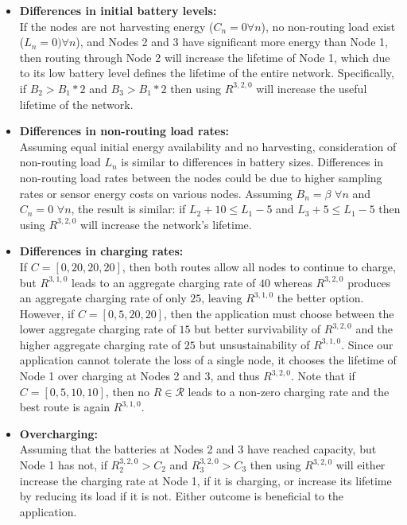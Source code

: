 \begin{itemize}

\item \textbf{Differences in initial battery levels:}\\If the nodes are not
harvesting energy ($C_n = 0 \forall n$), no non-routing load
exist ($L_n = 0) \forall n$), and Nodes 2 and 3 have significant more energy
than Node 1, then routing through Node 2 will increase the lifetime of Node
1, which due to its low battery level defines the lifetime of the entire
network. Specifically, if $B_2 > B_1 * 2$ and $B_3 > B_1 * 2$  then using
$R^{3,2,0}$ will increase the useful lifetime of the network.

\item \textbf{Differences in non-routing load rates:}\\Assuming equal initial
energy availability and no harvesting, consideration of non-routing load
$L_n$ is similar to differences in battery sizes. Differences in non-routing
load rates between the nodes could be due to higher sampling rates or sensor
energy costs on various nodes. Assuming $B_n = \beta$ $\forall n$ and $C_n =
0$ $\forall n$, the result is similar: if $L_2 + 10 \le L_1 - 5$ and $L_3 + 5
\le L_1 - 5$ then using $R^{3,2,0}$ will increase the network's lifetime.

\item \textbf{Differences in charging rates:}\\If $C = [0, 20, 20, 20]$, then
both routes allow all nodes to continue to charge, but $R^{3,1,0}$ leads to
an aggregate charging rate of $40$ whereas $R^{3,2,0}$  produces an
aggregate charging rate of only $25$, leaving $R^{3,1,0}$ the better option.
However, if $C = [0, 5, 20, 20]$, then the application must choose between
the lower aggregate charging rate of $15$ but better survivability of
$R^{3,2,0}$ and the higher aggregate charging rate of $25$ but
unsustainability of $R^{3,1,0}$.  Since our application cannot tolerate the
loss of a single node, it chooses the lifetime of Node 1 over charging at
Nodes 2 and 3, and thus $R^{3,2,0}$.  Note that if $C = [0, 5, 10, 10]$, then
no $R \in \mathcal{R}$ leads to a non-zero charging rate and the best route
is again $R^{3,1,0}$.

\item \textbf{Overcharging:}\\Assuming that the batteries at Nodes 2 and 3
have reached capacity, but Node 1 has not, if $R^{3,2,0}_2 > C_2$ and
$R^{3,2,0}_3 > C_3$ then using $R^{3,2,0}$ will either increase the charging
rate at Node 1, if it is charging, or increase its lifetime by reducing its
load if it is not. Either outcome is beneficial to the application.

\end{itemize}

